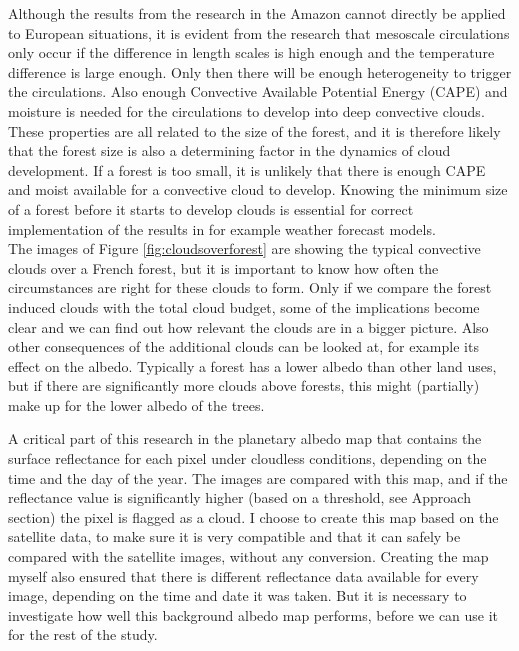 \documentclass{article}
\begin{document}
Although the results from the research in the Amazon cannot directly be applied to European situations, it is evident from the research that mesoscale circulations only occur if the difference in length scales is high enough and the temperature difference is large enough. Only then there will be enough heterogeneity to trigger the circulations. Also enough Convective Available Potential Energy (CAPE) and moisture is needed for the circulations to develop into deep convective clouds. These properties are all related to the size of the forest, and it is therefore likely that the forest size is also a determining factor in the dynamics of cloud development. If a forest is too small, it is unlikely that there is enough CAPE and moist available for a convective cloud to develop. Knowing the minimum size of a forest before it starts to develop clouds is essential for correct implementation of the results in for example weather forecast models.\\

The images of Figure \ref{fig:cloudsoverforest} are showing the typical convective clouds over a French forest, but it is important to know how often the circumstances are right for these clouds to form. Only if we compare the forest induced clouds with the total cloud budget, some of the implications become clear and we can find out how relevant the clouds are in a bigger picture. Also other consequences of the additional clouds can be looked at, for example its effect on the albedo. Typically a forest has a lower albedo than other land uses, but if there are significantly more clouds above forests, this might (partially) make up for the lower albedo of the trees.

A critical part of this research in the planetary albedo map that contains the surface reflectance for each pixel under cloudless conditions, depending on the time and the day of the year. The images are compared with this map, and if the reflectance value is significantly higher (based on a threshold, see Approach section) the pixel is flagged as a cloud. I choose to create this map based on the satellite data, to make sure it is very compatible and that it can safely be compared with the satellite images, without any conversion. Creating the map myself also ensured that there is different reflectance data available for every image, depending on the time and date it was taken. But it is necessary to investigate how well this background albedo map performs, before we can use it for the rest of the study.
\end{document}
